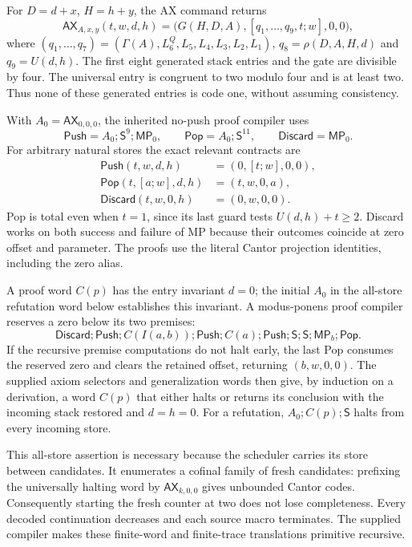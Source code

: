 \documentclass[11pt,letterpaper]{article}
\newcommand{\AX}{\mathsf{AX}}
\newcommand{\MP}{\mathsf{MP}}
\newcommand{\Shift}{\mathsf{S}}
\begin{document}
For $D=d+x$, $H=h+y$, the AX command returns
\[
 \AX_{A,x,y}(t,w,d,h)=
 \bigl(G(H,D,A),[q_1,\ldots,q_9,t;w],0,0\bigr),
\]
where $(q_1,\ldots,q_7)=(\Gamma(A),L_6^Q,L_5,L_4,L_3,L_2,L_1)$,
$q_8=\rho(D,A,H,d)$ and $q_9=U(d,h)$. The first eight generated
stack entries and the gate are divisible by four. The universal entry
is congruent to two modulo four and is at least two. Thus none of these
generated entries is code one, without assuming consistency.

With $A_0=\AX_{0,0,0}$, the inherited no-push proof compiler uses
\[
 \mathsf{Push}=A_0;\Shift^9;\MP_0,\qquad
 \mathsf{Pop}=A_0;\Shift^{11},\qquad
 \mathsf{Discard}=\MP_0.
\]
For arbitrary natural stores the exact relevant contracts are
\begin{align*}
 \mathsf{Push}(t,w,d,h)&=(0,[t;w],0,0),\\
 \mathsf{Pop}(t,[a;w],d,h)&=(t,w,0,a),\\
 \mathsf{Discard}(t,w,0,h)&=(0,w,0,0).
\end{align*}
Pop is total even when $t=1$, since its last guard tests $U(d,h)+t\ge2$.
Discard works on both success and failure of MP because their outcomes
coincide at zero offset and parameter. The proofs use the literal
Cantor projection identities, including the zero alias.

A proof word $C(p)$ has the entry invariant $d=0$; the initial $A_0$ in
the all-store refutation word below establishes this invariant. A
modus-ponens proof compiler reserves a zero below its two premises:
\[
 \mathsf{Discard};\mathsf{Push};C(I(a,b));\mathsf{Push};
 C(a);\mathsf{Push};\Shift;\Shift;\MP_b;\mathsf{Pop}.
\]
If the recursive premise computations do not halt early, the last Pop
consumes the reserved zero and clears the retained offset, returning
$(b,w,0,0)$. The supplied axiom selectors and generalization words then
give, by induction on a derivation, a word $C(p)$ that either halts or
returns its conclusion with the incoming stack restored and $d=h=0$.
For a refutation,
$A_0;C(p);\Shift$ halts from every incoming store.

This all-store assertion is necessary because the scheduler carries its
store between candidates. It enumerates a cofinal family of fresh
candidates: prefixing the universally halting word by $\AX_{k,0,0}$ gives
unbounded Cantor codes. Consequently starting the fresh counter at two
does not lose completeness. Every decoded continuation decreases and
each source macro terminates. The supplied compiler makes these
finite-word and finite-trace translations primitive recursive.
\end{document}
